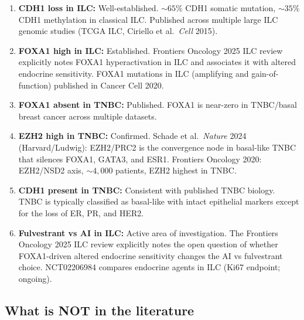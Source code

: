 \documentclass[12pt, a4paper]{article}
\begin{document}
\begin{enumerate}
    \item \textbf{CDH1 loss in ILC:}
    Well-established. ${\sim}65\%$ CDH1 somatic
    mutation, ${\sim}35\%$ CDH1 methylation in
    classical ILC. Published across multiple
    large ILC genomic studies (TCGA ILC, Ciriello
    et al.\ \textit{Cell} 2015).

    \item \textbf{FOXA1 high in ILC:}
    Established. Frontiers Oncology 2025 ILC
    review explicitly notes FOXA1 hyperactivation
    in ILC and associates it with altered endocrine
    sensitivity. FOXA1 mutations in ILC (amplifying
    and gain-of-function) published in Cancer Cell
    2020.

    \item \textbf{FOXA1 absent in TNBC:}
    Published. FOXA1 is near-zero in TNBC/basal
    breast cancer across multiple datasets.

    \item \textbf{EZH2 high in TNBC:}
    Confirmed. Schade et al.\ \textit{Nature}
    2024 (Harvard/Ludwig): EZH2/PRC2 is the
    convergence node in basal-like TNBC that
    silences FOXA1, GATA3, and ESR1.
    Frontiers Oncology 2020: EZH2/NSD2 axis,
    ${\sim}4{,}000$ patients, EZH2 highest
    in TNBC.

    \item \textbf{CDH1 present in TNBC:}
    Consistent with published TNBC biology.
    TNBC is typically classified as basal-like
    with intact epithelial markers except for
    the loss of ER, PR, and HER2.

    \item \textbf{Fulvestrant vs AI in ILC:}
    Active area of investigation. The Frontiers
    Oncology 2025 ILC review explicitly notes
    the open question of whether FOXA1-driven
    altered endocrine sensitivity changes the
    AI vs fulvestrant choice. NCT02206984
    compares endocrine agents in ILC (Ki67
    endpoint; ongoing).
\end{enumerate}

\subsection{What is NOT in the literature}
\end{document}
